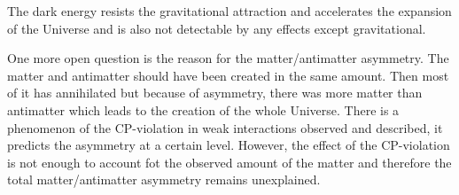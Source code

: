 The dark energy resists the gravitational attraction and accelerates the expansion of the Universe and is also not detectable by any effects except gravitational. 

One more open question is the reason for the matter/antimatter asymmetry. The matter and antimatter should have been created in the same amount. Then most of it has annihilated but because of asymmetry, there was more matter than antimatter which leads to the creation of the whole Universe. There is a phenomenon of the CP-violation in weak interactions observed and described, it predicts the asymmetry at a certain level. However, the effect of the CP-violation is not enough to account fot the observed amount of the matter and therefore the total matter/antimatter asymmetry remains unexplained. 


